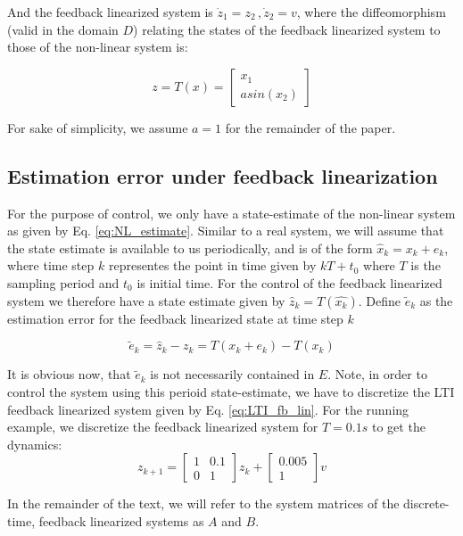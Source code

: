 And the feedback linearized system is $\dot{z}_1 = z_2\, ,\dot{z}_2 = v$, where the diffeomorphism (valid in the domain $D$) relating the states of the feedback linearized system to those of the non-linear system is:

\begin{equation}
z = T(x) = \begin{bmatrix} x_1 \\ asin(x_2) \end{bmatrix}
\end{equation}

For sake of simplicity, we assume $a=1$ for the remainder of the paper.

\subsection{Estimation error under feedback linearization}

For the purpose of control, we only have a state-estimate of the non-linear system as given by Eq. \ref{eq:NL_estimate}. Similar to a real system, we will assume that the state estimate is available to us periodically, and is of the form $\hat{x}_k = x_k + e_k$, where time step $k$ representes the point in time given by $kT+t_0$ where $T$ is the sampling period and $t_0$ is initial time. For the control of the feedback linearized system we therefore have a state estimate given by $\hat{z}_k = T(\hat{x_k})$. Define $\tilde{e}_k$ as the estimation error for the feedback linearized state at time step $k$

\begin{equation}
\tilde{e}_k =\hat{z}_k - z_k =  T(x_k + e_k) - T(x_k)
\end{equation}

It is obvious now, that $\tilde{e}_k$ is not necessarily contained in  $E$. Note, in order to control the system using this perioid state-estimate, we have to discretize the LTI feedback linearized system given by Eq. \ref{eq:LTI_fb_lin}. For the running example, we discretize the feedback linearized system for $T=0.1s$ to get the dynamics:
\begin{equation}
\label{toy_dt}
z_{k+1} = \begin{bmatrix} 1 & 0.1 \\ 0 & 1 \end{bmatrix} z_k + \begin{bmatrix} 0.005 \\ 1 \end{bmatrix}v
\end{equation}

In the remainder of the text, we will refer to the system matrices of the discrete-time, feedback linearized systems as $A$ and $B$.
